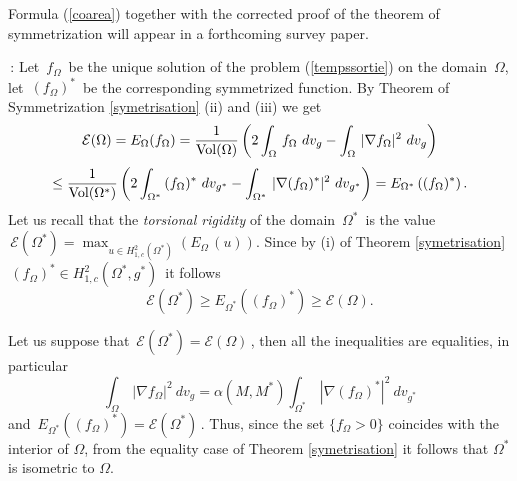 \documentclass[11pt, reqno]{amsart}
\theoremstyle{plain}
\begin{document}
Formula (\ref{coarea}) together with the corrected proof of the theorem of symmetrization will appear in a forthcoming survey paper.

\vskip 0.3cm

\,:
\noindent
Let $\,f_\Omega\,$ be the unique solution of the problem (\ref{tempssortie}) on the domain 
$\,\Omega$, let $\,(f_\Omega)^*\,$ be the corresponding symmetrized function. By Theorem of Symmetrization \ref{symetrisation} (ii) and (iii) we get
$${\mathcal E} (\Omega) = E_\Omega ( f_\Omega) = \dfrac{1}{{\rm Vol} (\Omega)} 
\left( 2 \int_\Omega \, f_\Omega\ dv_g - \int_\Omega \,|\nabla f_\Omega|^2 \ dv_g \right)$$
$$ \le \dfrac{1}{{\rm Vol} (\Omega^*)} 
\left( 2 \int_{\Omega^*} \, (f_\Omega)^*\ dv_{g^*} - \int_{\Omega^*} \,|\nabla (f_\Omega)^*|^2 
\ dv_{g^*} \right) = E_{\Omega^*} \left( (f_\Omega)^*\right) .$$
Let us recall that the {\em torsional rigidity} of the domain $\,\Omega^*\,$ is the value
$\,{\mathcal E} (\Omega^*) = \max_{u \in H_{1,c}^2 (\Omega^*)} \left( E_\Omega\, (u)\right)$. Since by (i) of Theorem \ref{symetrisation} 
$\,(f_\Omega)^* \in H_{1,c}^2 (\Omega^*, g^*) \,$ it follows
$${\mathcal E} (\Omega^*) \ge  E_{\Omega^*} \left( (f_\Omega)^*\right) \ge {\mathcal E} (\Omega).$$

\noindent Let us suppose that $\,{\mathcal E} (\Omega^*) = {\mathcal E} (\Omega)\,$, then
all the inequalities are equalities, in particular 
$$  \int_\Omega \,|\nabla f_\Omega|^2 \ dv_g  =  \alpha (M , M^*) \int_{\Omega^*} \,|\nabla (f_\Omega)^*|^2 \ dv_{g^*} $$
and $\,E_{\Omega^*} \left((f_\Omega)^*\right) = {\mathcal E} (\Omega^*) \,$.  Thus, since the set $\{f_\Omega>0\}$ coincides with the interior of $\Omega$, from the equality case of Theorem \ref{symetrisation} it follows that $\Omega^*\,$ is isometric to $\Omega$.

\vskip 0.3cm
\end{document}
